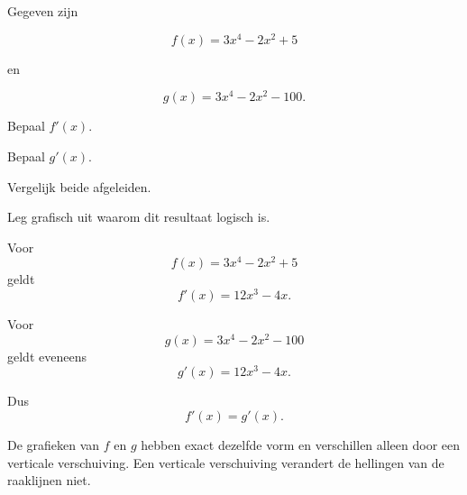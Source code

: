\documentclass{ximera}
\begin{document}

\begin{oefening}{\oefB\ESS}

Gegeven zijn

\[
f(x)=3x^4-2x^2+5
\]

en

\[
g(x)=3x^4-2x^2-100.
\]

\begin{question}
Bepaal $f'(x)$.
\end{question}

\begin{question}
Bepaal $g'(x)$.
\end{question}

\begin{question}
Vergelijk beide afgeleiden.
\end{question}

\begin{question}
Leg grafisch uit waarom dit resultaat logisch is.
\end{question}

\begin{oplossing}

Voor
\[
f(x)=3x^4-2x^2+5
\]
geldt
\[
f'(x)=12x^3-4x.
\]

Voor
\[
g(x)=3x^4-2x^2-100
\]
geldt eveneens
\[
g'(x)=12x^3-4x.
\]

Dus
\[
\boxed{f'(x)=g'(x)}.
\]

De grafieken van $f$ en $g$ hebben exact dezelfde vorm en verschillen alleen
door een verticale verschuiving. Een verticale verschuiving verandert de
hellingen van de raaklijnen niet.

\end{oplossing}

\end{oefening}



\end{document}
